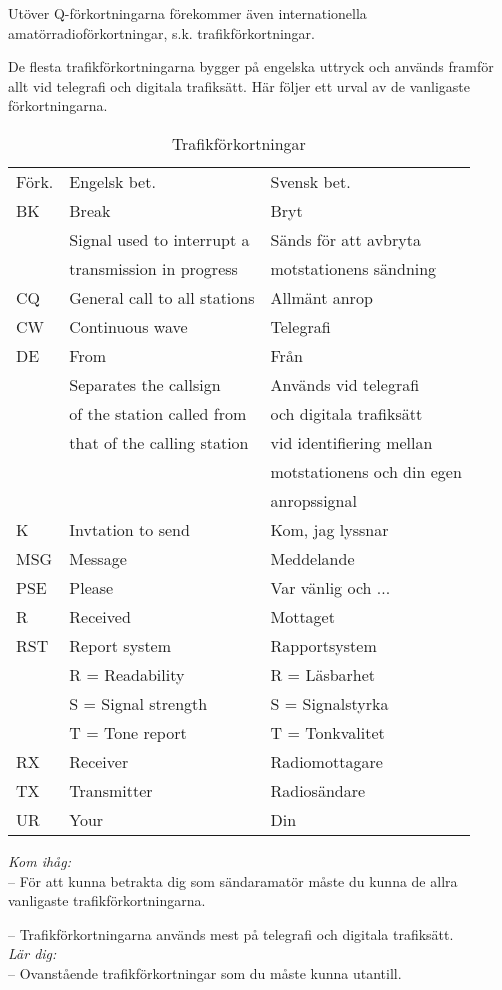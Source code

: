 Utöver Q-förkortningarna förekommer även internationella
amatörradioförkortningar, s.k. trafikförkortningar.

De flesta trafikförkortningarna bygger på engelska uttryck och används
framför allt vid telegrafi och digitala trafiksätt. Här följer ett
urval av de vanligaste förkortningarna.

\begin{table}[h]
  \begin{tabular}{lll}
    Förk. & Engelsk bet. & Svensk bet.\\
    BK & Break & Bryt\\
    & Signal used to interrupt a & Sänds för att avbryta\\
    & transmission in progress  & motstationens sändning\\
    CQ & General call to all stations & Allmänt anrop\\
    CW & Continuous wave & Telegrafi\\
    DE & From & Från\\
    & Separates the callsign      & Används vid telegrafi \\
    & of the station called from  & och digitala trafiksätt\\
    & that of the calling station & vid identifiering mellan\\
    &                             & motstationens och din egen\\
    &                             & anropssignal\\
    K & Invtation to send & Kom, jag lyssnar\\
    MSG & Message & Meddelande\\
    PSE & Please & Var vänlig och ...\\
    R & Received & Mottaget\\
    RST & Report system & Rapportsystem\\
    & R = Readability & R = Läsbarhet\\
    & S = Signal strength & S = Signalstyrka\\
    & T = Tone report & T = Tonkvalitet\\
    RX & Receiver & Radiomottagare\\
    TX & Transmitter & Radiosändare\\
    UR & Your & Din\\
  \end{tabular}
  \caption{Trafikförkortningar}
  \label{tab:trafikforkortningar}
\end{table}

\noindent\emph{Kom ihåg:}\\

-- För att kunna betrakta dig som sändaramatör måste du kunna de allra
vanligaste trafikförkortningarna.

-- Trafikförkortningarna används mest på telegrafi och digitala
trafiksätt.\\

\noindent\emph{Lär dig:}\\

-- Ovanstående trafikförkortningar som du måste kunna utantill.
